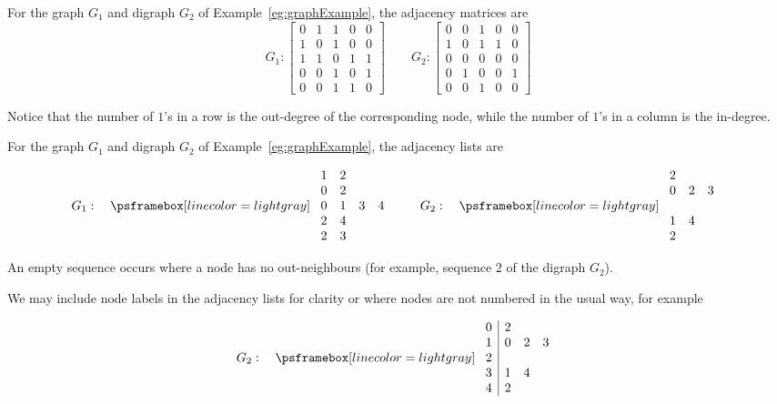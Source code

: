 \begin{Example}
For the graph $G_1$ and digraph $G_2$ of Example~\ref{eg:graphExample}, 
the adjacency matrices are
$$
G_1: 
\left[
\begin{matrix}
0 & 1 & 1 & 0 & 0 \\
1 & 0 & 1 & 0 & 0 \\
1 & 1 & 0 & 1 & 1 \\
0 & 0 & 1 & 0 & 1 \\
0 & 0 & 1 & 1 & 0 
\end{matrix}
\right]
\qquad 
G_2: 
\left[
\begin{matrix}
0 & 0 & 1 & 0 & 0 \\
1 & 0 & 1 & 1 & 0 \\
0 & 0 & 0 & 0 & 0 \\
0 & 1 & 0 & 0 & 1 \\
0 & 0 & 1 & 0 & 0 
\end{matrix}
\right]
$$

Notice that the number of $1$'s in a row is the out-degree
 of the corresponding node, while the number of $1$'s in a column is the in-degree.
 \end{Example}
 
 \begin{Example}
For the graph $G_1$ and digraph $G_2$ of Example~\ref{eg:graphExample}, 
the adjacency lists 
are
\begin{center}
$$
G_1: \quad
\AdjLists{
\begin{array}{cccc}
1 & 2  \\
0 & 2 \\
0 & 1 & 3 & 4  \\
2 & 4  \\
2 & 3  \\
\end{array}
}
 \qquad
G_2: 
\quad 
\AdjLists{
\begin{array}{ccc}
2  \\
0 & 2 & 3  \\
\\
1 & 4  \\
2 \\
\end{array}
}
$$
\end{center}

An empty sequence occurs where a node has no out-neighbours (for example, sequence $2$ of the digraph $G_2$). 

We may include node labels in the adjacency lists for clarity or where nodes are not numbered in the usual way, for example

$$
G_2: 
\quad 
\AdjLists{
\begin{array}{c|ccc}
0 & 2  \\
1 & 0 & 2 & 3  \\
2  \\
3 & 1 & 4  \\
4& 2 \\
\end{array}
}
$$

\end{Example}



